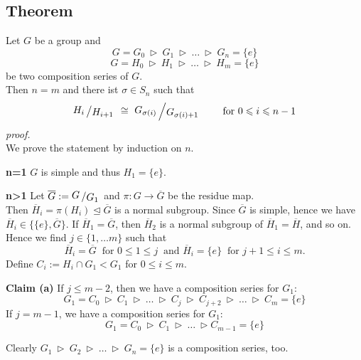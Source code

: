\documentclass[12pt]{book}
\newcommand{\slant}[2]{{\raisebox{.1em}{$#1$}\left/\raisebox{-.1em}{$#2$}\right.}}
\begin{document}
\begin{spacing}{1.3}
\subsection{Theorem } %
\titleformat{\subsection}{\normalfont\normalsize\bfseries}{}{0em}{#1 \thesubsection}
Let $G$ be a group and
$$G=G_0 \ \triangleright \ G_1 \ \triangleright \ \ldots \ \triangleright \ G_n = \{e\}$$
$$G=H_0 \ \triangleright \ H_1 \ \triangleright \ \ldots \ \triangleright \ H_m = \{e\}$$
be two composition series of $G$.\\
Then $n=m$ and there ist $\sigma \in S_n$ such that 
$$\slant{H_i}{H_{i+1}} \ \cong\ \slant{G_{\sigma(i)}}{G_{\sigma(i)+1}} \qquad \textrm{ for } 0 \leqslant i \leqslant n-1$$
\textit{proof.}\\
We prove the statement by induction on $n$.
\begin{compactitem}
\item[\textbf{n=1}] $G$ is simple and thus $H_1= \{e\}$.
\item[\textbf{n>1}] Let $\overline{G}:= \slant{G}{G_1}$ and $\pi:G \longrightarrow \overline{G}$ be the residue map.\\
Then $\overline{H}_i= \pi(H_i) \trianglelefteq \overline{G}$ is a normal subgroup. Since $\overline{G}$ is simple, hence we have $\overline{H}_i \in \{\{e\}, \overline{G}\}$. If $\overline{H}_1=\overline{G}$, then $\overline{H}_2$ is a normal subgroup of $\overline{H}_1=\overline{H}$, and so on. Hence we find $j \in \{1, \ldots m \}$ such that
$$\overline{H}_i= \overline{G} \ \textrm{ for } 0 \leqslant 1 \leqslant j \ \textrm{ and } \overline{H}_i=\{e\} \ \textrm{ for } j+1 \leqslant i \leqslant m.$$
Define $C_i:=H_i \cap G_1 < G_1 $ for $0 \leqslant i \leqslant m$. 
\begin{compactenum}
\item[\textbf{Claim (a)}] If $j \leqslant m-2$, then we have a composition series for $G_1$:
$$G_1=C_0 \ \triangleright \ C_1 \ \triangleright \ \ldots \ \triangleright \ C_j \ \triangleright \ C_{j+2} \ \triangleright \ \ldots \ \triangleright \ C_m= \{e\}$$
If $j=m-1$, we have a composition series for $G_1$:
$$G_1=C_0 \ \triangleright \ C_1 \ \triangleright \ \ldots \ \triangleright C_{m-1}=\{e\}$$
\end{compactenum}
Clearly $G_1 \ \triangleright \ G_2 \ \triangleright \ \ldots \ \triangleright \ G_n =\{e\}$ is a composition series, too.\\

\end{compactitem}
\end{spacing}
\end{document}
